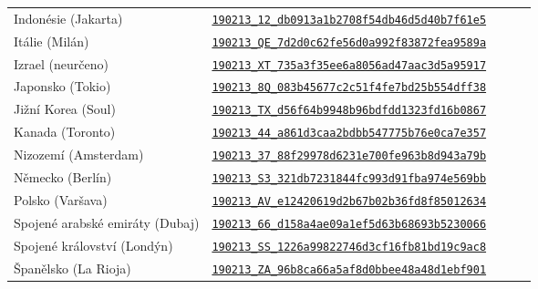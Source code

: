 \documentclass[a4paper, 12pt]{article}
\begin{document}
\begin{table}[H]
\begin{tabular}{*5l}
    Indonésie (Jakarta)             & \href{https://www.webpagetest.org/result/190213_12_db0913a1b2708f54db46d5d40b7f61e5}{\texttt{190213\_12\_db0913a1b2708f54db46d5d40b7f61e5}} \\
    Itálie (Milán)                  & \href{https://www.webpagetest.org/result/190213_QE_7d2d0c62fe56d0a992f83872fea9589a}{\texttt{190213\_QE\_7d2d0c62fe56d0a992f83872fea9589a}} \\
    Izrael (neurčeno)               & \href{https://www.webpagetest.org/result/190213_XT_735a3f35ee6a8056ad47aac3d5a95917}{\texttt{190213\_XT\_735a3f35ee6a8056ad47aac3d5a95917}} \\
    Japonsko (Tokio)                & \href{https://www.webpagetest.org/result/190213_8Q_083b45677c2c51f4fe7bd25b554dff38}{\texttt{190213\_8Q\_083b45677c2c51f4fe7bd25b554dff38}} \\
    Jižní Korea (Soul)              & \href{https://www.webpagetest.org/result/190213_TX_d56f64b9948b96bdfdd1323fd16b0867}{\texttt{190213\_TX\_d56f64b9948b96bdfdd1323fd16b0867}} \\
    Kanada (Toronto)                & \href{https://www.webpagetest.org/result/190213_44_a861d3caa2bdbb547775b76e0ca7e357}{\texttt{190213\_44\_a861d3caa2bdbb547775b76e0ca7e357}} \\
    Nizozemí (Amsterdam)            & \href{https://www.webpagetest.org/result/190213_37_88f29978d6231e700fe963b8d943a79b}{\texttt{190213\_37\_88f29978d6231e700fe963b8d943a79b}} \\
    Německo (Berlín)                & \href{https://www.webpagetest.org/result/190213_S3_321db7231844fc993d91fba974e569bb}{\texttt{190213\_S3\_321db7231844fc993d91fba974e569bb}} \\
    Polsko (Varšava)                & \href{https://www.webpagetest.org/result/190213_AV_e12420619d2b67b02b36fd8f85012634}{\texttt{190213\_AV\_e12420619d2b67b02b36fd8f85012634}} \\
    Spojené arabské emiráty (Dubaj) & \href{https://www.webpagetest.org/result/190213_66_d158a4ae09a1ef5d63b68693b5230066}{\texttt{190213\_66\_d158a4ae09a1ef5d63b68693b5230066}} \\
    Spojené království (Londýn)     & \href{https://www.webpagetest.org/result/190213_SS_1226a99822746d3cf16fb81bd19c9ac8}{\texttt{190213\_SS\_1226a99822746d3cf16fb81bd19c9ac8}} \\
    Španělsko (La Rioja)            & \href{https://www.webpagetest.org/result/190213_ZA_96b8ca66a5af8d0bbee48a48d1ebf901}{\texttt{190213\_ZA\_96b8ca66a5af8d0bbee48a48d1ebf901}} \\

\end{tabular}
\end{table}
\end{document}
